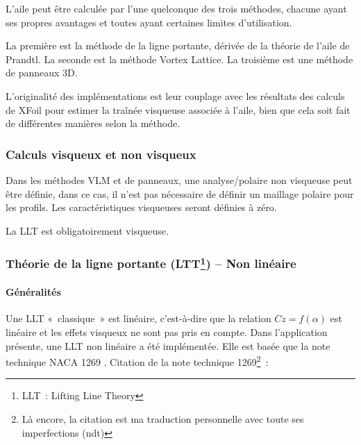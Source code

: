 \documentclass[a4paper,twoside,12pt,dvips]{article}
\begin{document}
L’aile peut être calculée par l’une quelconque des trois méthodes, chacune 
ayant ses propres avantages et toutes ayant certaines limites d’utilisation.

La première est la méthode de la ligne portante, dérivée de la théorie de 
l’aile de Prandtl. La seconde est la méthode Vortex Lattice. La troisième est 
une méthode de panneaux 3D.

L’originalité des implémentations est leur couplage avec les résultats des 
calculs de XFoil pour estimer la traînée visqueuse associée à l’aile, bien 
que cela soit fait de différentes manières selon la méthode. 

\subsubsection{Calculs visqueux et non visqueux}

Dans les méthodes VLM et de panneaux, une analyse/polaire non visqueuse peut 
être définie, dans ce cas, il n’est pas nécessaire de définir un maillage 
polaire pour les profils. Les caractéristiques visqueuses seront définies à 
zéro.

La LLT est obligatoirement visqueuse. 

\subsubsection{Théorie de la ligne portante (LTT\protect\footnote{LLT~: Lifting Line Theory}) – Non linéaire}

\paragraph{Généralités}

Une LLT «~classique~» est linéaire, c’est-à-dire que la relation $ Cz = 
f(\alpha) $ est linéaire et les effets visqueux ne sont pas pris en compte.
Dans l’application présente, une LLT non linéaire a été implémentée. Elle
est basée que la note technique NACA 1269 \cite{Sivells47}.
Citation de la note technique 1269\footnote{Là encore, la citation est ma traduction personnelle avec toute ses imperfections (ndt)}~:
\end{document}
